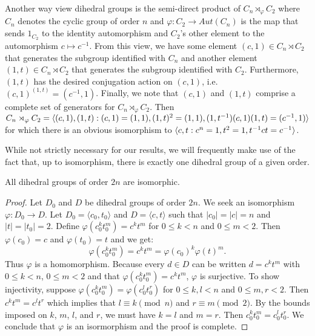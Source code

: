 \documentclass[main.tex]{subfiles}
\begin{document}
Another way view dihedral groups is the semi-direct product of $C_n \rtimes_\varphi C_2$ where $C_n$ denotes the cyclic group of order $n$ and $\varphi : C_2 \to Aut(C_n)$ is the map that sends $1_{C_2}$ to the identity automorphism and $C_2$'s other element to the automorphism $c \mapsto c^{-1}$. From this view, we have some element $(c, 1) \in C_n \rtimes C_2$ that generates the subgroup identified with $C_n$ and another element $(1, t) \in C_n \rtimes C_2$ that generates the subgroup identified with $C_2$. Furthermore, $(1, t)$ has the desired conjugation action on $(c, 1)$, i.e. $(c,1)^{(1,t)} = (c^{-1}, 1)$. Finally, we note that $(c, 1)$ and $(1, t)$ comprise a complete set of generators for $C_n \rtimes_\varphi C_2$. Then $C_n \rtimes_\varphi C_2 = \langle (c, 1), (1, t) : (c, 1) = (1, 1), (1, t)^2 = (1, 1), (1, t^{-1})(c, 1)(1, t) = (c^{-1}, 1) \rangle$ for which there is an obvious isomorphism to $\langle c, t : c^n = 1, t^2 = 1, t^{-1} c t = c^{-1} \rangle$.

\hss

While not strictly necessary for our results, we will frequently make use of the fact that, up to isomorphism, there is exactly one dihedral group of a given order.

\begin{theorem}
All dihedral groups of order $2n$ are isomorphic.
\end{theorem}

\begin{proof}
Let $D_0$ and $D$ be dihedral groups of order $2n$. We seek an isomorphism $\varphi: D_0 \to D$. Let $D_0 = \langle c_0, t_0 \rangle$ and $D = \langle c, t \rangle$ such that $|c_0| = |c| = n$ and $|t| = |t_0| = 2$. Define $\varphi(c_0^k t_0^m) = c^k t^m$ for $0 \le k < n$ and $0 \le m < 2$. Then $\varphi(c_0) = c$ and $\varphi(t_0) = t$ and we get:
$$\varphi(c_0^k t_0^m) = c^k t^m = \varphi(c_0)^k \varphi(t)^m \text{.}$$
Thus $\varphi$ is a homomorphism. Because every $d \in D$ can be written $d = c^k t^m$ with $0 \le k < n$, $0 \le m < 2$ and that $\varphi(c_0^k t_0^m) = c^k t^m$,  $\varphi$ is surjective. To show injectivity, suppose $\varphi(c_0^k t_0^m) = \varphi(c_0^l t_0^r)$ for $0 \le k, l < n$ and $0 \le m, r < 2$. Then $c^k t^m = c^l t^r$ which implies that $l \equiv k \pmod n$ and $r \equiv m \pmod 2$. By the bounds imposed on $k$, $m$, $l$, and $r$, we must have $k = l$ and $m = r$.  Then $c_0^k t_0^m = c_0^l t_0^r$. We conclude that $\varphi$ is an isormorphism and the proof is complete.
\end{proof}
\end{document}
